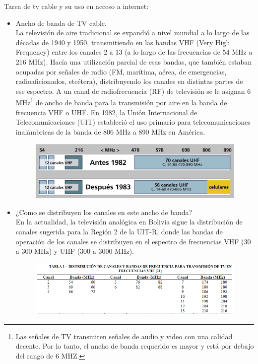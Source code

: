 {\color{red} Tarea de tv cable y su uso en acceso a internet:}



\begin{itemize}
\item {\color{red} Ancho de banda de TV cable.}\\
La televisión de aire tradicional se expandió a nivel mundial a lo largo de las décadas de 1940 y 1950, transmitiendo en las bandas VHF (Very High Frequency) entre los canales 2 a 13 (a lo largo de las frecuencias de 54 MHz a 216 MHz). Hacía una utilización parcial de esas bandas, que también estaban ocupadas por señales de radio (FM, marítima, aérea, de emergencias, radioaficionados, etcétera), distribuyendo los canales en distintas partes de ese espectro. A un canal de radiofrecuencia (RF) de televisión se le asignan 6 MHz\footnote{Las señales de TV transmiten señales de audio y video con una calidad decente. Por lo tanto, el ancho de banda requerido es mayor y está por debajo del rango de 6 MHZ.} de ancho de banda para la transmisión por aire en la banda de frecuencia VHF o UHF. En 1982, la Unión Internacional de Telecomunicaciones (UIT) estableció el uso primario para telecomunicaciones inalámbricas de la banda de 806 MHz a 890 MHz en América.

\begin{figure}[ht!]
\centering
\includegraphics[scale=0.33]{Imagenes/fontanels-03_opt.jpeg}
\end{figure}

\item {\color{red} ¿Como se distribuyen los canales en este ancho de banda?}\\
En la actualidad, la televisión analógica en Bolivia sigue la distribución de canales sugerida para la Región 2 de la   UIT-R, donde las bandas de operación de los canales se distribuyen en el espectro de frecuencias VHF (30 a 300 MHz) y UHF (300 a 3000 MHz).

\begin{figure}[ht!]
\centering
\includegraphics[scale=0.5]{Imagenes/a09_table_01.png}
\end{figure}


\end{itemize}
